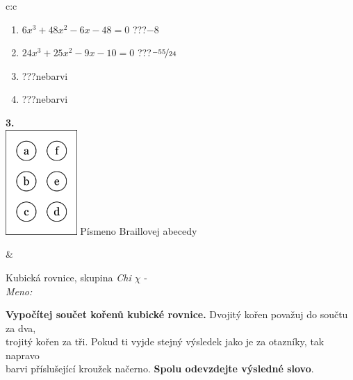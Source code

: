 \documentclass[10pt]{report}
\begin{document}
\begin{tabular}{c:c}
\begin{minipage}[c][104.5mm][t]{0.5\linewidth}
\begin{center}
\begin{minipage}{0.79\linewidth}
\begin{center}
\begin{varwidth}{\linewidth}
\begin{enumerate}
\item $6x^3+48x^2-6x-48=0$\quad \dotfill\; ???\;\dotfill \quad $-8$
\item $24x^3+25x^2-9x-10=0$\quad \dotfill\; ???\;\dotfill \quad $\nicefrac{-55}{24}$
\item \quad \dotfill\; ???\;\dotfill \quad nebarvi
\item \quad \dotfill\; ???\;\dotfill \quad nebarvi
\end{enumerate}
\end{varwidth}
\end{center}
\end{minipage}
\begin{minipage}{0.20\linewidth}
\begin{center}
{\Huge\bfseries 3.} \\[2mm]
\includegraphics[height=40mm]{../images/braille.png}
{\small Písmeno Braillovej abecedy}
\end{center}
\end{minipage}
\end{center}
\end{minipage}
&
\begin{minipage}[c][104.5mm][t]{0.5\linewidth}
\begin{center}
\vspace{7mm}
{\huge Kubická rovnice, skupina \textit{Chi $\chi$} -}\\[5mm]
\textit{Meno:}\phantom{xxxxxxxxxxxxxxxxxxxxxxxxxxxxxxxxxxxxxxxxxxxxxxxxxxxxxxxxxxxxxxxxx}\\[5mm]
\begin{minipage}{0.95\linewidth}
\textbf{Vypočítej součet kořenů kubické rovnice.} Dvojitý kořen považuj do součtu za dva,\\trojitý kořen za tři. Pokud ti vyjde stejný výsledek jako je za otazníky, tak napravo\\barvi příslušející kroužek načerno. \textbf{Spolu odevzdejte výsledné slovo}.
\end{minipage}
\\[1mm]
\begin{minipage}{0.79\linewidth}
\begin{center}

\end{center}
\end{minipage}
\end{center}
\end{minipage}
\end{tabular}
\end{document}
